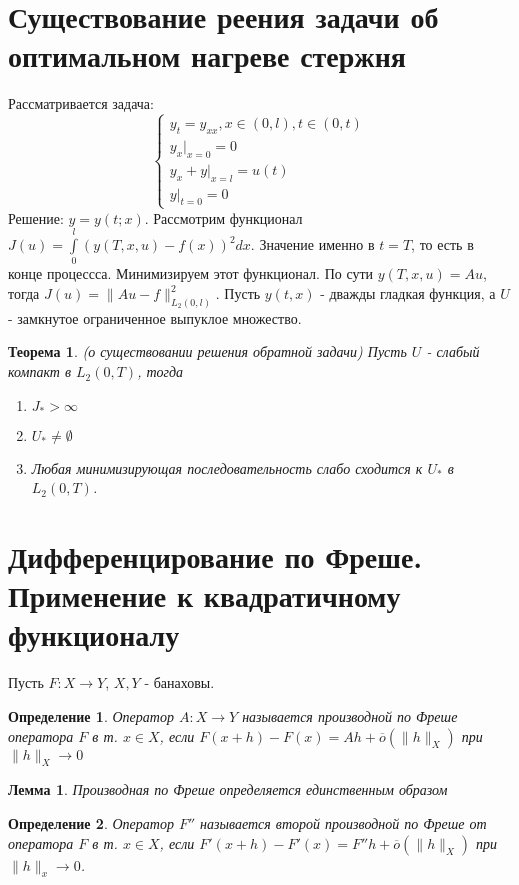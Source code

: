 \documentclass[9pt, a4paper]{extarticle}
\newtheorem*{theorem}{Теорема}
\newtheorem*{lemma}{Лемма}
\newtheorem*{definition}{Определение}
\begin{document}
\section{Существование реения задачи об оптимальном нагреве стержня}
	Рассматривается задача:
	\begin{equation*}
		\begin{cases}
			y_t = y_{xx} , x \in (0, l), t \in (0, t)\\
			y_x\vert_{x=0} = 0 \\
			y_x + y\vert_{x = l} = u(t) \\
			y\vert_{t=0} = 0
		\end{cases}
	\end{equation*}
	Решение: $y = y(t; x)$. Рассмотрим функционал $J(u) = \int\limits_0^l \left(y(T, x, u) - f(x)\right)^2 dx$. Значение именно в $t = T$, то есть в конце процессса. Минимизируем этот функционал. По сути $y(T, x, u) = Au$, тогда $J(u) = \|Au - f\|_{L_2(0,l)}^2$.\newline
	Пусть $y(t, x)$ - дважды гладкая функция, а $U$ - замкнутое ограниченное выпуклое множество. 
	\begin{theorem}
		(о существовании решения обратной задачи)\newline
		Пусть $U$ - слабый компакт в $L_2(0,T)$, тогда 
		\begin{enumerate}
			\item $J_* > \infty$
			\item $U_* \neq \emptyset$
			\item Любая минимизирующая последовательность слабо сходится к $U_*$  в $L_2(0,T)$. 
		\end{enumerate}
	\end{theorem}
\section{Дифференцирование по Фреше. Применение к квадратичному функционалу}
	Пусть $F: X \to Y$, $X,Y$ - банаховы.
	\begin{definition}
		Оператор $A:X \to Y$ называется производной по Фреше оператора $F$ в т. $x \in X$, если $F(x+h) - F(x) = Ah + \overline{o}(\|h\|_X)$ при $\|h\|_X \to 0$
	\end{definition}
	\begin{lemma}
		Производная по Фреше определяется единственным образом
	\end{lemma}
	\begin{definition}
		Оператор $F''$ называется второй производной по Фреше от оператора $F$ в т. $x \in X$, если $F'(x+h) - F'(x) = F''h + \overline{o}(\|h\|_X)$ при $\|h\|_x \to 0$. 
	\end{definition}
	
\end{document}
